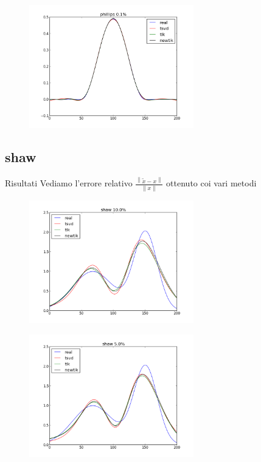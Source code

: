 \documentclass{beamer}
\theoremstyle{plain}
\theoremstyle{definition}
\theoremstyle{remark}
\newcommand{\norm}[1]{\left\|#1\right\|}
\begin{document}
\begin{frame}
  \begin{figure}
    \centering
    \includegraphics[keepaspectratio,width=270px]{phillips_1.png}
  \end{figure}
\end{frame}


\subsection{shaw}

\begin{frame}{Risultati}
  Vediamo l'errore relativo $\frac{\norm{\tilde x - x}}{\norm{x}}$
  ottenuto coi vari metodi
  \begin{center}
    
  \end{center}
\end{frame}

\begin{frame}
  \begin{figure}
    \centering
    \includegraphics[keepaspectratio,width=270px]{shaw_100.png}
  \end{figure}
\end{frame}

\begin{frame}
  \begin{figure}
    \centering
    \includegraphics[keepaspectratio,width=270px]{shaw_50.png}
  \end{figure}
\end{frame}
\end{document}
